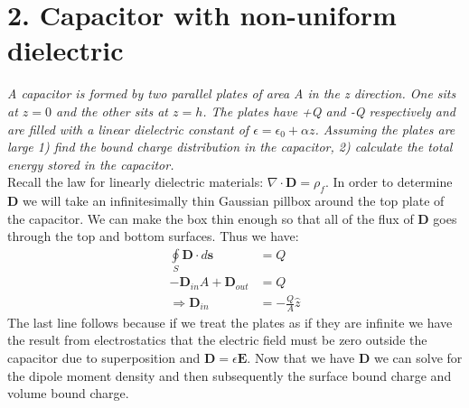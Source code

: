 \documentclass[a4paper, 11pt]{article}
\begin{document}
\section*{2. Capacitor with non-uniform dielectric}
\textit{A capacitor is formed by two parallel plates of area A in the z direction. One sits at $z=0$ and the other sits at $z=h$. The plates have +Q and -Q respectively and are filled with a linear dielectric constant of $\epsilon = \epsilon_0 + \alpha z$. Assuming the plates are large 1) find the bound charge distribution in the capacitor, 2) calculate the total energy stored in the capacitor. }\\ 

\noindent Recall the law for linearly dielectric materials: $\nabla \cdot \mathbf{D} = \rho_f$. In order to determine \textbf{D} we will take an infinitesimally thin Gaussian pillbox around the top plate of the capacitor. We can make the box thin enough so that all of the flux of \textbf{D} goes through the top and bottom surfaces. Thus we have: 
	\begin{align*}
		\oint\limits_S \mathbf{D} \cdot d\mathbf{s} &= Q \\ 
		-\mathbf{D}_{in}A + \mathbf{D}_{out}  &= Q \\
		\Rightarrow \mathbf{D}_{in} &= -\frac{Q}{A} \hat{z} 
	\end{align*}
The last line follows because if we treat the plates as if they are infinite we have the result from electrostatics that the electric field must be zero outside the capacitor due to superposition and $\mathbf{D} = \epsilon\mathbf{E}$. Now that we have \textbf{D} we can solve for the dipole moment density and then subsequently the surface bound charge and volume bound charge. \\ 
\end{document}
